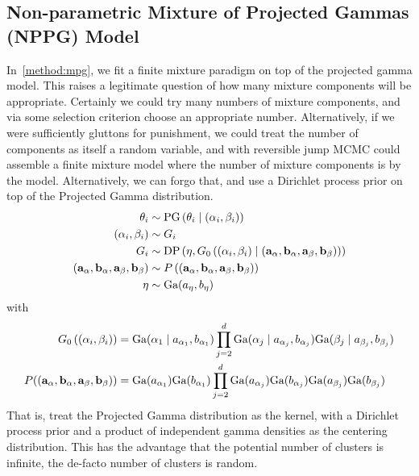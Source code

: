 \subsection{Non-parametric Mixture of Projected Gammas (NPPG) Model}
\label{method:nppg}
In~\ref{method:mpg}, we fit a finite mixture paradigm on top of the projected
  gamma model.  This raises a legitimate question of how many mixture components
  will be appropriate.  Certainly we could try many numbers of mixture components,
  and via some selection criterion choose an appropriate number.  Alternatively, if
  we were sufficiently gluttons for punishment, we could treat the number of
  components as itself a random variable, and with reversible jump MCMC could
  assemble a finite mixture model where the number of mixture components is
  by the model.  Alternatively, we can forgo that, and use a Dirichlet process
  prior on top of the Projected Gamma distribution.
\begin{equation}
  \label{eqn:nppg}
  \begin{aligned}
    \theta_i &\sim \text{PG}\left(\theta_i\mid ({\bf \alpha}_i, {\bf \beta}_i) \right)\\
    ({\bf \alpha}_i, {\bf \beta}_i) &\sim G_i\\
    G_i &\sim \text{DP}\left(\eta, G_0\left(({\bf \alpha}_i, {\bf \beta}_i)\mid ({\bf a}_{\alpha}, {\bf b}_{\alpha}, {\bf a}_{\beta}, {\bf b}_{\beta}) \right)\right)\\
     ({\bf a}_{\alpha}, {\bf b}_{\alpha}, {\bf a}_{\beta}, {\bf b}_{\beta}) &\sim P\left(({\bf a}_{\alpha}, {\bf b}_{\alpha}, {\bf a}_{\beta}, {\bf b}_{\beta})\right)\\
     \eta &\sim \text{Ga}(a_{\eta},b_{\eta})
  \end{aligned}
\end{equation}
with
\begin{equation*}
    \begin{aligned}
    G_0\left(({\bf \alpha}_i, {\bf \beta}_i)\right) &= \text{Ga}(\alpha_1\mid a_{\alpha_1},b_{\alpha_1})\prod_{j = 2}^d\text{Ga}(\alpha_j\mid a_{\alpha_j}, b_{\alpha_j})\text{Ga}(\beta_j\mid a_{\beta_j}, b_{\beta_j})\\
    P(({\bf a}_{\alpha}, {\bf b}_{\alpha}, {\bf a}_{\beta}, {\bf b}_{\beta})) &= \text{Ga}(a_{\alpha_1})\text{Ga}(b_{\alpha_1})\prod_{j = 2}^d\text{Ga}(a_{\alpha_j})\text{Ga}(b_{\alpha_j})\text{Ga}(a_{\beta_j})\text{Ga}(b_{\beta_j})
    \end{aligned}
\end{equation*}
That is, treat the Projected Gamma distribution as the kernel, with a
  Dirichlet process prior and a product of independent gamma densities as the
  centering distribution.  This has the advantage that the potential number of
  clusters is infinite, the de-facto number of clusters is random.

